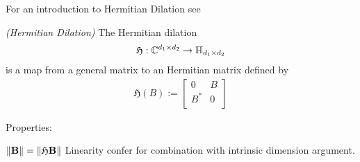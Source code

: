 For an introduction to Hermitian Dilation see \cite[§2.1.16]{Tropp2015}
\begin{definition}
  \emph{(Hermitian Dilation)}
  The Hermitian dilation
  \begin{gather*}
    \mathfrak{H} : \mathbb{C}^{d_1 \times d_2} \to \mathbb{H}_{d_1 \times d_2}
  \end{gather*}
  is a map from a general matrix to an Hermitian matrix defined by
  \begin{gather}
    \label{ rmineq_hermitian_dilation } 
    \mathfrak{H}(B)
    :=
    \begin{bmatrix}
      0   & B \\
      B^* & 0 \\
    \end{bmatrix}
  \end{gather}
\end{definition}

Properties:

$
\left\lVert\mathbf{B}\right\rVert
=
\left\lVert\mathfrak{H}\mathbf{B}\right\rVert
$
Linearity
confer \cite[§7.7.3]{Tropp2015}
for combination with intrinsic dimension argument.
